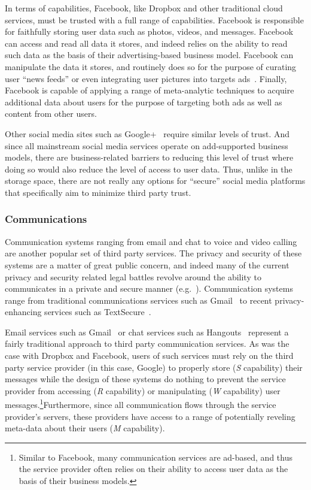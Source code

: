 In terms of capabilities, Facebook, like Dropbox and other traditional
cloud services, must be trusted with a full range of capabilities.
Facebook is responsible for faithfully storing user data such as
photos, videos, and messages. Facebook can access and read all data it
stores, and indeed relies on the ability to read such data as the
basis of their advertising-based business model. Facebook can
manipulate the data it stores, and routinely does so for the purpose
of curating user ``news feeds'' or even integrating user pictures into
targets ads~\cite{mashable-socialads}. Finally, Facebook is capable of
applying a range of meta-analytic techniques to acquire additional
data about users for the purpose of targeting both ads as well as
content from other users.

Other social media sites such as Google+~\cite{google-plus}
require similar levels of trust. And since all mainstream social media
services operate on add-supported business models, there are
business-related barriers to reducing this level of trust where doing
so would also reduce the level of access to user data. Thus, unlike in
the storage space, there are not really any options for ``secure''
social media platforms that specifically aim to minimize third party
trust.

\subsubsection{Communications}

Communication systems ranging from email and chat to voice and video
calling are another popular set of third party services. The privacy
and security of these systems are a matter of great public concern,
and indeed many of the current privacy and security related legal
battles revolve around the ability to communicates in a private and
secure manner (e.g.~\cite{apple-fbiletter, greenwald-prism,
  levsion-lavabit}). Communication systems range from traditional
communications services such as Gmail~\cite{google-gmail} to recent
privacy-enhancing services such as
TextSecure~\cite{otr-advanced-ratchet}.

Email services such as Gmail~\cite{google-gmail} or chat services such
as Hangouts~\cite{google-hangouts} represent a fairly traditional
approach to third party communication services. As was the case with
Dropbox and Facebook, users of such services must rely on the third
party service provider (in this case, Google) to properly store
(\emph{S} capability) their messages while the design of these systems
do nothing to prevent the service provider from accessing (\emph{R}
capability) or manipulating (\emph{W} capability) user
messages.\footnote{Similar to Facebook, many communication services
  are ad-based, and thus the service provider often relies on their
  ability to access user data as the basis of their business
  models.}Furthermore, since all communication flows through the
service provider's servers, these providers have access to a range of
potentially reveling meta-data about their users (\emph{M}
capability).

